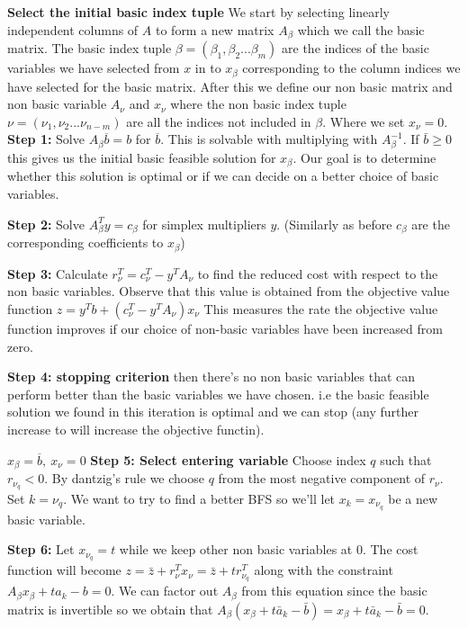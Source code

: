 \documentclass{assignment}
\begin{document}
\begin{algorithmic}
    \State \textbf{Select the initial basic index tuple}
    \State We start by selecting linearly independent columns of $A$ to form a new matrix $A_\beta$ which we call the basic matrix. 
    The basic index tuple $\beta = (\beta_1, \beta_2...\beta_m)$ are the indices of the 
    basic variables we have selected from $x$ in to $x_\beta$ corresponding to the column indices we have selected for the basic matrix. 
    After this we define our non basic matrix and non basic variable $A_\nu$ and $x_\nu$ where the non basic index tuple $\nu = (\nu_1,\nu_2...\nu_{n-m})$ are all the indices not included in $\beta$.
    Where we set $x_\nu = 0$.
    \State \textbf{Step 1:}
    \State Solve $A_{\beta}\overline{b} = b$ for $\overline{b}$. This is solvable with multiplying with $A_\beta^{-1}$. If $\bar{b}\ge 0$ this gives us the initial
    basic feasible solution for $x_\beta$. Our goal is to determine whether this solution is optimal or if we can decide on a better choice of basic variables.
    
    \State \textbf{Step 2: }
    \State Solve $A_{\beta}^T y = c_{\beta}$ for simplex multipliers $y$. (Similarly as before $c_\beta$ are the corresponding coefficients to $x_\beta$)
    
    \State \textbf{Step 3: }
    \State Calculate $r_{\nu}^T = c_{\nu}^T - y^T A_{\nu}$ to find the reduced cost with respect to the non basic variables. Observe that this value is obtained from the objective value function $z = y^Tb + (c_\nu^T - y^TA_\nu)x_\nu$
    This measures the rate the objective value function improves if our choice of non-basic variables have been increased from zero.
    
    \State \textbf{Step 4: stopping criterion}
        \State then there's no non basic variables that can perform better than the basic variables we have chosen. i.e the basic feasible solution we found in this iteration is optimal and we can stop (any further increase to  will increase the objective functin). 

        \State \Return $x_{\beta} = \overline{b}, \ x_{\nu} = 0$
    \Else
        \State \textbf{Step 5: Select entering variable}
        \State Choose index $q$ such that $r_{\nu_q} < 0$. By dantzig's rule we choose $q$ from the most negative component of $r_\nu$.
        \State Set $k = \nu_q$. We want to try to find a better BFS so we'll let $x_k = x_{\nu_q}$ be a new basic variable.
        
        \State \textbf{Step 6: }
        \State Let $x_{\nu_q} = t$ while we keep other non basic variables at $0$. The cost function will become $z = \bar{z} + r_{\nu}^Tx_\nu = \bar{z} + tr_{\nu_q}^T$ along with
        the constraint $A_\beta x_\beta + ta_k - b = 0$. We can factor out $A_\beta$ from this equation since the basic matrix is invertible 
        so we obtain that $A_\beta (x_\beta + t\bar{a}_k - \bar{b}) = x_\beta + t\bar{a}_k - \bar{b} = 0$. 


\end{algorithmic}
\end{document}
